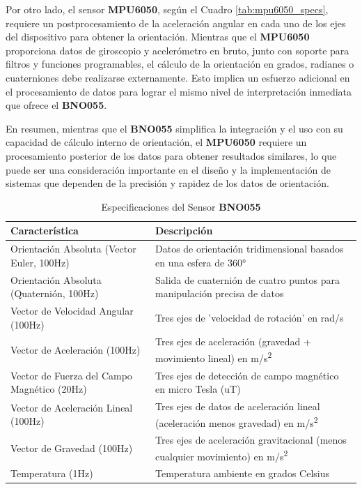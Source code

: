             Por otro lado, el sensor \textbf{MPU6050}, según el Cuadro \ref{tab:mpu6050_specs}, requiere un postprocesamiento de la aceleración angular en cada uno de los ejes del dispositivo para obtener la orientación. Mientras que el \textbf{MPU6050} proporciona datos de giroscopio y acelerómetro en bruto, junto con soporte para filtros y funciones programables, el cálculo de la orientación en grados, radianes o cuaterniones debe realizarse externamente. Esto implica un esfuerzo adicional en el procesamiento de datos para lograr el mismo nivel de interpretación inmediata que ofrece el \textbf{BNO055}. \vspace{5px} 
            
            En resumen, mientras que el \textbf{BNO055} simplifica la integración y el uso con su capacidad de cálculo interno de orientación, el \textbf{MPU6050} requiere un procesamiento posterior de los datos para obtener resultados similares, lo que puede ser una consideración importante en el diseño y la implementación de sistemas que dependen de la precisión y rapidez de los datos de orientación.\vspace{5px}

            \begin{table}[h]
                \centering
                \caption{Especificaciones del Sensor \textbf{BNO055}}
                \label{tab:bno055_specs}
                \begin{tabular}{|l|l|}
                    \hline
                    \textbf{Característica} & \textbf{Descripción} \\ \hline
                    Orientación Absoluta (Vector Euler, 100Hz) & Datos de orientación tridimensional basados en una esfera de 360° \\ \hline
                    Orientación Absoluta (Quaternión, 100Hz) & Salida de cuaternión de cuatro puntos para manipulación precisa de datos \\ \hline
                    Vector de Velocidad Angular (100Hz) & Tres ejes de 'velocidad de rotación' en rad/s \\ \hline
                    Vector de Aceleración (100Hz) & Tres ejes de aceleración (gravedad + movimiento lineal) en m/s\textsuperscript{2} \\ \hline
                    Vector de Fuerza del Campo Magnético (20Hz) & Tres ejes de detección de campo magnético en micro Tesla (uT) \\ \hline
                    Vector de Aceleración Lineal (100Hz) & Tres ejes de datos de aceleración lineal (aceleración menos gravedad) en m/s\textsuperscript{2} \\ \hline
                    Vector de Gravedad (100Hz) & Tres ejes de aceleración gravitacional (menos cualquier movimiento) en m/s\textsuperscript{2} \\ \hline
                    Temperatura (1Hz) & Temperatura ambiente en grados Celsius \\ \hline
                \end{tabular}
            \end{table}

